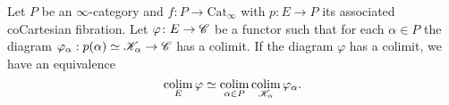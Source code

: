 \documentclass[../../thesis.tex]{subfiles}
\begin{document}
\begin{proposition}
    Let $P$ be an $\infty$-category and $f\colon P\to \mathrm{Cat}_{\infty}$ with $p\colon E\to P$ its associated coCartesian fibration.
    Let $\varphi \colon E \to \mathscr{C}$ be a functor such that for each $\alpha \in P$ the diagram $\varphi_{\alpha}:p(\alpha)\simeq \mathscr{K}_{\alpha}\to \mathscr{C}$ has a colimit.
    If the diagram $\varphi$ has a colimit, we have an equivalence
    \[
        \operatorname*{colim}_{E} \varphi\simeq \operatorname*{colim}_{\alpha\in P}\operatorname*{colim}_{\mathscr{K}_{\alpha}}\varphi_{\alpha}.
    \]
\end{proposition}
\end{document}
